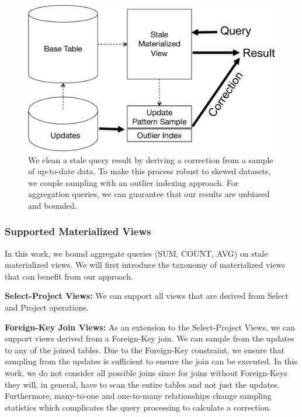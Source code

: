 \begin{figure}[h]
\label{sys-arch}
\centering
 \includegraphics[width=\columnwidth]{figs/sys-arch.pdf}
 \caption{We clean a stale query result by deriving a correction from a sample of up-to-date data. To make this process robust to skewed datasets, we couple sampling with an outlier indexing approach. For aggregation queries, we can guarantee that our results are unbiased and bounded.}
\end{figure}

\subsubsection{Supported Materialized Views}\label{subsubsec:supported-view}
In this work, we bound aggregate queries (SUM, COUNT, AVG) on stale materialized views.
We will first introduce the taxonomy of materialized views that can benefit from our approach. 
\vspace{1em}

\noindent\textbf{Select-Project Views: } We can support all views that are derived from Select and Project operations. 

\vspace{1em}

\noindent\textbf{Foreign-Key Join Views: } As an extension to the Select-Project Views, we can support views derived from a Foreign-Key join. We can sample from the updates to any of the joined tables. Due to the Foreign-Key constraint, we ensure that sampling from the updates is sufficient to ensure the join can be executed. In this work, we do not consider all possible joins since for joins without Foreign-Keys they will, in general, have to scan the entire tables and not just the updates. Furthermore, many-to-one and one-to-many relationships change sampling statistics which complicates the query processing to calculate a correction.

